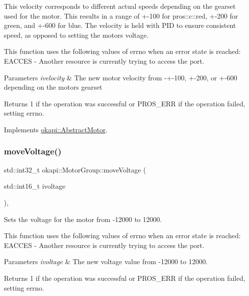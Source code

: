 This velocity corresponds to different actual speeds depending on the gearset used for the motor. This results in a range of +-\/100 for pros\+::c\+::red, +-\/200 for green, and +-\/600 for blue. The velocity is held with P\+ID to ensure consistent speed, as opposed to setting the motor\textquotesingle{}s voltage.

This function uses the following values of errno when an error state is reached\+: E\+A\+C\+C\+ES -\/ Another resource is currently trying to access the port.


\begin{DoxyParams}{Parameters}
{\em ivelocity} & The new motor velocity from -\/+-\/100, +-\/200, or +-\/600 depending on the motor\textquotesingle{}s gearset \\
\hline
\end{DoxyParams}
\begin{DoxyReturn}{Returns}
1 if the operation was successful or P\+R\+O\+S\+\_\+\+E\+RR if the operation failed, setting errno. 
\end{DoxyReturn}


Implements \mbox{\hyperlink{classokapi_1_1AbstractMotor_a3170268f8d06f728327dcda08505e02b}{okapi\+::\+Abstract\+Motor}}.

\mbox{\label{classokapi_1_1MotorGroup_acebebe160f2c733ee497b1b8b50b0781}} 
\subsubsection{\texorpdfstring{moveVoltage()}{moveVoltage()}}
{\footnotesize\ttfamily std\+::int32\+\_\+t okapi\+::\+Motor\+Group\+::move\+Voltage (\begin{DoxyParamCaption}\item[{std\+::int16\+\_\+t}]{ivoltage }\end{DoxyParamCaption})\hspace{0.3cm}{\ttfamily [override]}, {\ttfamily [virtual]}}

Sets the voltage for the motor from -\/12000 to 12000.

This function uses the following values of errno when an error state is reached\+: E\+A\+C\+C\+ES -\/ Another resource is currently trying to access the port.


\begin{DoxyParams}{Parameters}
{\em ivoltage} & The new voltage value from -\/12000 to 12000. \\
\hline
\end{DoxyParams}
\begin{DoxyReturn}{Returns}
1 if the operation was successful or P\+R\+O\+S\+\_\+\+E\+RR if the operation failed, setting errno. 
\end{DoxyReturn}


